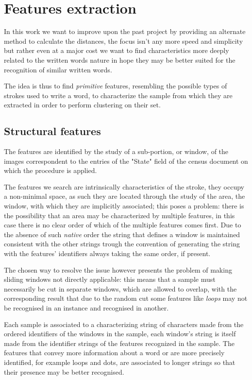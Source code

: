 \section{Features extraction}

In this work we want to improve upon the past project by providing an alternate method to calculate the distances, the focus isn't any more speed and simplicity but rather even at a major cost we want to find characteristics more deeply related to the written words nature in hope they may be better suited for the recognition of similar written words.


The idea is thus to find \emph{primitive} features, resembling the possible types of strokes used to write a word, to characterize the sample from which they are extracted in order to perform clustering on their set.

\subsection{Structural features}

The features are identified by the study of a sub-portion, or window, of the images correspondent to the entries of the "State" field of the census document on which the procedure is applied.

The features we search are intrinsically characteristics of the stroke, they occupy a non-minimal space, as such they are located through the study of the area, the window, with which they are implicitly associated; this poses a problem: there is the possibility that an area may be characterized by multiple features, in this case there is no clear order of which of the multiple features comes first.
Due to the absence of such \emph{native} order the string that defines a window is maintained consistent with the other strings trough the convention of generating the string with the features' identifiers always taking the same order, if present.

The chosen way to resolve the issue however presents the problem of making sliding windows not directly applicable: this means that a sample must necessarily be cut in separate windows, which are allowed to overlap, with the corresponding result that due to the random cut some features like \textit{loops} may not be recognised in an instance and recognised in another. 

Each sample is associated to a characterizing string of characters made from the ordered identifiers of the windows in the sample, each window's string is itself made from the identifier strings of the features recognized in the sample.
The features that convey more information about a word or are more precisely identified, for example loops and dots, are associated to longer strings so that their presence may be better recognised.

